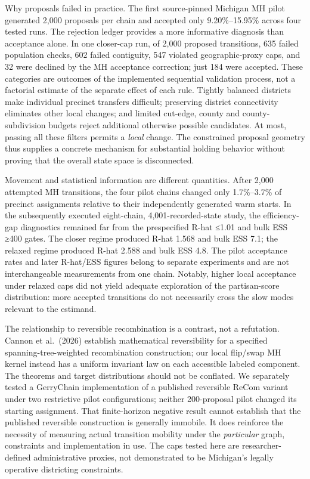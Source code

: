 \documentclass[
  10pt,
]{article}
\begin{document}
Why proposals failed in practice. The first source-pinned Michigan MH
pilot generated 2,000 proposals per chain and accepted only
9.20\%--15.95\% across four tested runs. The rejection ledger provides a
more informative diagnosis than acceptance alone. In one closer-cap run,
of 2,000 proposed transitions, 635 failed population checks, 602 failed
contiguity, 547 violated geographic-proxy caps, and 32 were declined by
the MH acceptance correction; just 184 were accepted. These categories
are outcomes of the implemented sequential validation process, not a
factorial estimate of the separate effect of each rule. Tightly balanced
districts make individual precinct transfers difficult; preserving
district connectivity eliminates other local changes; and limited
cut-edge, county and county-subdivision budgets reject additional
otherwise possible candidates. At most, passing all these filters
permits a \emph{local} change. The constrained proposal geometry thus
supplies a concrete mechanism for substantial holding behavior without
proving that the overall state space is disconnected.

Movement and statistical information are different quantities. After
2,000 attempted MH transitions, the four pilot chains changed only
1.7\%--3.7\% of precinct assignments relative to their independently
generated warm starts. In the subsequently executed eight-chain,
4,001-recorded-state study, the efficiency-gap diagnostics remained far
from the prespecified R-hat ≤1.01 and bulk ESS ≥400 gates. The closer
regime produced R-hat 1.568 and bulk ESS 7.1; the relaxed regime
produced R-hat 2.588 and bulk ESS 4.8. The pilot acceptance rates and
later R-hat/ESS figures belong to separate experiments and are not
interchangeable measurements from one chain. Notably, higher local
acceptance under relaxed caps did not yield adequate exploration of the
partisan-score distribution: more accepted transitions do not
necessarily cross the slow modes relevant to the estimand.

The relationship to reversible recombination is a contrast, not a
refutation. Cannon et al.~(2026) establish mathematical reversibility
for a specified spanning-tree-weighted recombination construction; our
local flip/swap MH kernel instead has a uniform invariant law on each
accessible labeled component. The theorems and target distributions
should not be conflated. We separately tested a GerryChain
implementation of a published reversible ReCom variant under two
restrictive pilot configurations; neither 200-proposal pilot changed its
starting assignment. That finite-horizon negative result cannot
establish that the published reversible construction is generally
immobile. It does reinforce the necessity of measuring actual transition
mobility under the \emph{particular} graph, constraints and
implementation in use. The caps tested here are researcher-defined
administrative proxies, not demonstrated to be Michigan's legally
operative districting constraints.
\end{document}
